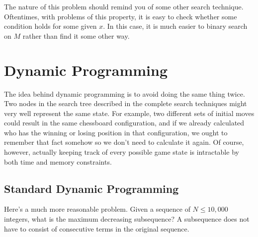 The nature of this problem should remind you of some other search technique. Oftentimes, with problems of this property, it is easy to check whether some condition holds for some given $x$. In this case, it is much easier to binary search on $M$ rather than find it some other way.

\section{Dynamic Programming}

The idea behind dynamic programming is to avoid doing the same thing twice. Two nodes in the search tree described in the complete search techniques might very well represent the same state. For example, two different sets of initial moves could result in the same chessboard configuration, and if we already calculated who has the winning or losing position in that configuration, we ought to remember that fact somehow so we don't need to calculate it again. Of course, however, actually keeping track of every possible game state is intractable by both time and memory constraints.

\subsection{Standard Dynamic Programming}

Here's a much more reasonable problem. Given a sequence of $N \le 10,000$ integers, what is the maximum decreasing subsequence? A subsequence does not have to consist of consecutive terms in the original sequence.

\begin{center}
{
}
\end{center}

